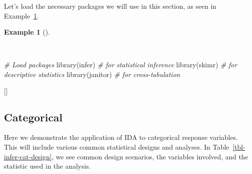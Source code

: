 \documentclass[
  letterpaper,
  krantz1]{latex/krantz-mod}
\newenvironment{Shaded}{\begin{snugshade}}{\end{snugshade}}
\newcommand{\CommentTok}[1]{\textcolor[rgb]{0.00,0.00,0.00}{\textit{#1}}}
\newcommand{\FunctionTok}[1]{\textcolor[rgb]{0.00,0.00,0.00}{#1}}
\newcommand{\NormalTok}[1]{\textcolor[rgb]{0.00,0.00,0.00}{#1}}
\newcommand{\cindex}[1]{%
  \StrSubstitute{#1}{_}{\_}[\temp]%
  \index{\temp}%
}
\theoremstyle{definition}
\theoremstyle{definition}
\newtheorem{example}{Example}[chapter]
\theoremstyle{remark}
\begin{document}
Let's load the necessary packages we will use in this section, as seen
in Example~\ref{exm-infer-setup}.

\pagebreak

\begin{example}[]\protect\hypertarget{exm-infer-setup}{}\label{exm-infer-setup}

~

\begin{Shaded}
\begin{Highlighting}[numbers=left,,]
\CommentTok{\# Load packages}
\FunctionTok{library}\NormalTok{(infer)      }\CommentTok{\# for statistical inference}
\FunctionTok{library}\NormalTok{(skimr)      }\CommentTok{\# for descriptive statistics}
\FunctionTok{library}\NormalTok{(janitor)    }\CommentTok{\# for cross{-}tabulation}
\end{Highlighting}
\end{Shaded}

\cindex{library()}

\end{example}

\subsection{Categorical}\label{sec-infer-categorical}

Here we demonstrate the application of IDA to categorical response
variables. This
will include various common statistical designs and analyses. In
Table~\ref{tbl-infer-cat-design}, we see common design scenarios, the
variables involved, and the statistic used in the analysis.
\end{document}
